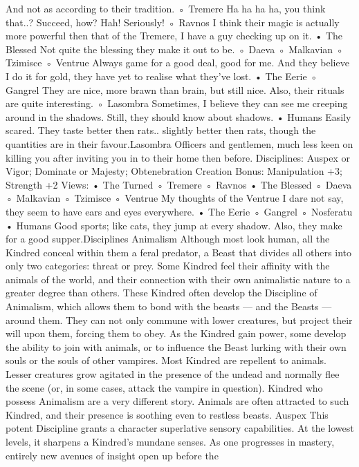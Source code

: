 \documentclass[10pt,a4paper]{article}
\begin{document}
And not as according to their tradition.
◦ Tremere
Ha ha ha ha, you think that..? Succeed, how? Hah! Seriously!
◦ Ravnos
I think their magic is actually more powerful then that of the
Tremere, I have a guy checking up on it.
• The Blessed
Not quite the blessing they make it out to be.
◦ Daeva
◦ Malkavian
◦ Tzimisce
◦ Ventrue
Always game for a good deal, good for me. And they believe I
do it for gold, they have yet to realise what they've lost.
• The Eerie
◦ Gangrel
They are nice, more brawn than brain, but still nice. Also, their
rituals are quite interesting.
◦ Lasombra
Sometimes, I believe they can see me creeping around in the
shadows. Still, they should know about shadows.
• Humans
Easily scared. They taste better then rats.. slightly better then rats,
though the quantities are in their favour.Lasombra
Officers and gentlemen, much less keen on killing you after inviting you in
to their home then before.
Disciplines: Auspex or Vigor; Dominate or Majesty; Obtenebration
Creation Bonus:
Manipulation +3; Strength +2
Views:
• The Turned
◦ Tremere
◦ Ravnos
• The Blessed
◦ Daeva
◦ Malkavian
◦ Tzimisce
◦ Ventrue
My thoughts of the Ventrue I dare not say, they seem to have
ears and eyes everywhere.
• The Eerie
◦ Gangrel
◦ Nosferatu
• Humans
Good sports; like cats, they jump at every shadow. Also, they make
for a good supper.Disciplines
Animalism
Although most look human, all the Kindred conceal within them a feral
predator, a Beast that divides all others into only two categories: threat or
prey. Some Kindred feel their affinity with the animals of the world, and
their connection with their own animalistic nature to a greater degree than
others. These Kindred often develop the Discipline of Animalism, which
allows them to bond with the beasts — and the Beasts — around them.
They can not only commune with lower creatures, but project their will
upon them, forcing them to obey. As the Kindred gain power, some develop
the ability to join with animals, or to influence the Beast lurking with their
own souls or the souls of other vampires.
Most Kindred are repellent to animals. Lesser creatures grow agitated in the
presence of the undead and normally flee the scene (or, in some cases,
attack the vampire in question). Kindred who possess Animalism are a very
different story. Animals are often attracted to such Kindred, and their
presence is soothing even to restless beasts.
Auspex
This potent Discipline grants a character superlative sensory capabilities. At
the lowest levels, it sharpens a Kindred’s mundane senses. As one
progresses in mastery, entirely new avenues of insight open up before the
\end{document}
